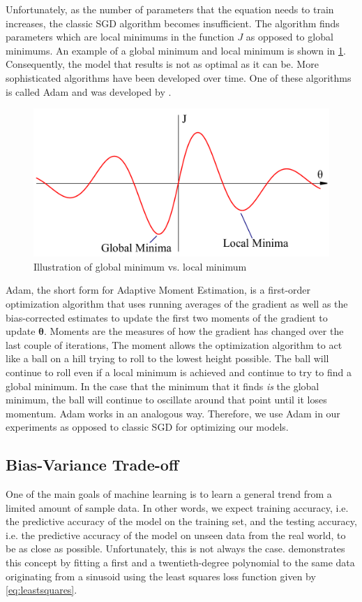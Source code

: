 Unfortunately, as the number of parameters that the equation needs to train increases, the classic SGD algorithm becomes insufficient. The algorithm finds parameters which are local minimums in the function $J$ as opposed to global minimums. An example of a global minimum and local minimum is shown in \cref{fig:minmax}. Consequently, the model that results is not as optimal as it can be. More sophisticated algorithms have been developed over time. One of these algorithms is called Adam and was developed by \citet{kingma2014adam}. 

\begin{figure}[!ht]
	\centering
	\includegraphics[width=0.6\linewidth]{pictures/minmax.pdf}
	\caption{Illustration of global minimum vs. local minimum}\label{fig:minmax}  
\end{figure}

Adam, the short form for Adaptive Moment Estimation, is a first-order optimization algorithm that uses running averages of the gradient as well as the  bias-corrected estimates to update the first two moments of the gradient to update $\boldsymbol{\theta}$. Moments are the measures of how the gradient has changed over the last couple of iterations,  The moment allows the optimization algorithm to act like a ball on a hill trying to roll to the lowest height possible. The ball will continue to roll even if a local minimum is achieved and continue to try to find a global minimum. In the case that the minimum that it finds \textit{is} the global minimum, the ball will continue to oscillate around that point until it loses momentum. Adam works in an analogous way. Therefore, we use Adam in our experiments as opposed to classic SGD for optimizing our models. 

\subsection{Bias-Variance Trade-off}
\label{bias_variance_tradeoff}

One of the main goals of machine learning is to learn a general trend from a limited amount of sample data. In other words, we expect training accuracy, i.e. the predictive accuracy of the model on the training set, and the testing accuracy, i.e. the predictive accuracy of the model on unseen data from the real world, to be as close as possible. Unfortunately, this is not always the case.  demonstrates this concept by fitting a first and a twentieth-degree polynomial to the same data originating from a sinusoid using the least squares loss function given by \cref{eq:leastsquares}. 

